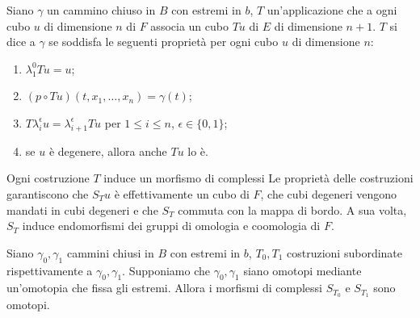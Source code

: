 \begin{definition}
Siano \(\gamma\) un cammino chiuso in \(B\) con estremi in \(b\), \(T\) un'applicazione che a ogni cubo \(u\) di dimensione \(n\) di \(F\) associa un cubo \(Tu\) di \(E\) di dimensione \(n+1\). \(T\) si dice  a \(\gamma\) se soddisfa le seguenti proprietà per ogni cubo \(u\) di dimensione \(n\):
\begin{enumerate}
\item \(\lambda^0_1 Tu=u\);
\item \((p\circ Tu)(t,x_1,\ldots,x_n)=\gamma(t)\);
\item \(T\lambda^\epsilon_iu=\lambda^\epsilon_{i+1}Tu\) per \(1\le i\le n\), \(\epsilon\in\{0,1\}\);
\item se \(u\) è degenere, allora anche \(Tu\) lo è.
\end{enumerate}
\end{definition}
Ogni costruzione \(T\) induce un morfismo di complessi
Le proprietà delle costruzioni garantiscono che \(S_Tu\) è effettivamente un cubo di \(F\), che cubi degeneri vengono mandati in cubi degeneri e che \(S_T\) commuta con la mappa di bordo. A sua volta, \(S_T\) induce endomorfismi dei gruppi di omologia e coomologia di \(F\).
\begin{proposition}
Siano \(\gamma_0,\gamma_1\) cammini chiusi in \(B\) con estremi in \(b\), \(T_0,T_1\) costruzioni subordinate rispettivamente a \(\gamma_0,\gamma_1\). Supponiamo che \(\gamma_0,\gamma_1\) siano omotopi mediante un'omotopia che fissa gli estremi. Allora i morfismi di complessi \(S_{T_0}\) e \(S_{T_1}\) sono omotopi.
\end{proposition}
